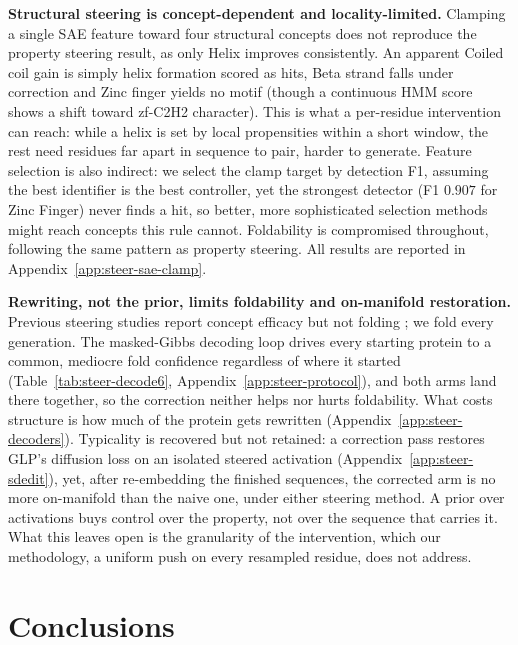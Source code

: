 \documentclass{article}
\begin{document}
\newpage

\textbf{Structural steering is concept-dependent and locality-limited.} Clamping a single SAE
feature toward four structural concepts does not reproduce the property steering result, as only Helix
improves consistently. An apparent Coiled coil gain is simply helix formation scored as hits, Beta strand falls under correction and Zinc finger yields no motif (though a continuous HMM score shows a shift
toward zf-C2H2 character). This is what a per-residue intervention can reach: while a helix is set by local propensities within a short window, the rest need residues far apart in sequence to pair, harder to generate. Feature selection is also indirect: we select the clamp target by detection F1,
assuming the best identifier is the best controller, yet the strongest detector (F1 $0.907$ for Zinc Finger) never
finds a hit, so better, more sophisticated selection methods might reach concepts this rule cannot. Foldability is compromised
throughout, following the same pattern as property steering. All results are reported in Appendix~\ref{app:steer-sae-clamp}.


\textbf{Rewriting, not the prior, limits foldability and on-manifold restoration.} Previous steering studies report concept efficacy but not folding \cite{villegas2025plmsae,huang2025diffmean}; we fold every generation. The masked-Gibbs decoding loop drives every starting protein to a common, mediocre fold confidence regardless of where it started (Table~\ref{tab:steer-decode6}, Appendix~\ref{app:steer-protocol}), and both arms land there together, so the correction neither helps nor hurts foldability. What costs structure is how much of
the protein gets rewritten (Appendix~\ref{app:steer-decoders}). Typicality is recovered but not retained: a correction pass restores GLP's diffusion loss on an isolated steered activation (Appendix~\ref{app:steer-sdedit}), yet, after re-embedding the finished sequences, the corrected arm is no more on-manifold than the naive one, under either steering method. A prior over activations buys control over the property, not over the sequence that carries it. What this leaves open is the granularity of the intervention, which our methodology, a uniform push on every resampled residue, does not address.

\section{Conclusions}
\label{sec:conclusions}
\end{document}
